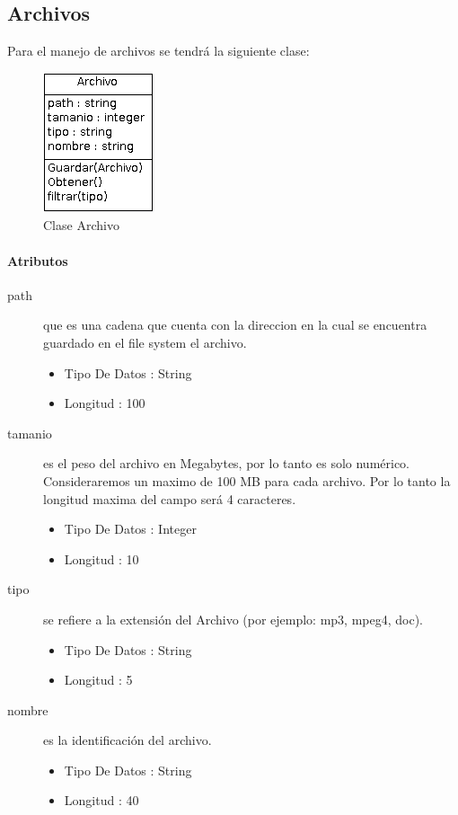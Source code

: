 \documentclass{article}
\begin{document}
\subsection{Archivos}
	Para el manejo de archivos se tendr\'a la siguiente clase:
	
\begin{figure}[h]
\centering
\includegraphics[scale=0.8]{Archivo}

\caption{Clase Archivo}
\end{figure}
	
\paragraph{\large{Atributos}}
\begin{description}
		\item[path] que es una cadena que cuenta con la direccion en la cual se encuentra guardado en el file system el archivo.
		\begin{itemize}
			\item Tipo De Datos : String
			\item Longitud : 100
		\end{itemize}
		\item[tamanio] es el peso del archivo en Megabytes, por lo tanto es solo num\'erico. Consideraremos un maximo de 100 MB para cada archivo. Por lo tanto la longitud maxima del campo ser\'a 4 caracteres.
		\begin{itemize}
			\item Tipo De Datos : Integer
			\item Longitud : 10
		\end{itemize}
		\item[tipo] se refiere a la extensi\'on del Archivo (por ejemplo: mp3, mpeg4, doc).
		\begin{itemize}
			\item Tipo De Datos : String
			\item Longitud : 5
		\end{itemize}
		\item[nombre] es la identificaci\'on del archivo.
		\begin{itemize}
			\item Tipo De Datos : String
			\item Longitud : 40
		\end{itemize}
\end{description}
\end{document}
